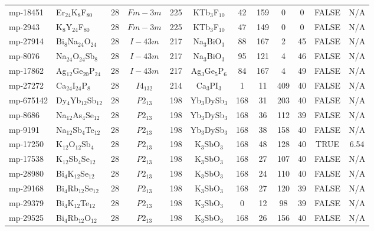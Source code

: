 {\begin{longtable}{llcccccccccc}
    mp-18451 & Er$_{24}$K$_{8}$F$_{80}$ & 28    & $Fm-3m$ & 225   & KTb$_{3}$F$_{10}$ & 42    & 159   & 0     & 0     & FALSE & N/A \\
    mp-2943 & K$_{8}$Y$_{24}$F$_{80}$ & 28    & $Fm-3m$ & 225   & KTb$_{3}$F$_{10}$ & 47    & 149   & 0     & 0     & FALSE & N/A \\
    mp-27914 & Bi$_{8}$Na$_{24}$O$_{24}$ & 28    & $I-43m$ & 217   & Na$_{3}$BiO$_{3}$ & 88    & 167   & 2     & 45    & FALSE & N/A \\
    mp-8076 & Na$_{24}$O$_{24}$Sb$_{8}$ & 28    & $I-43m$ & 217   & Na$_{3}$BiO$_{3}$ & 95    & 121   & 4     & 46    & FALSE & N/A \\
    mp-17862 & Ag$_{12}$Ge$_{20}$P$_{24}$ & 28    & $I-43m$ & 217   & Ag$_{3}$Ge$_{5}$P$_{6}$ & 84    & 167   & 4     & 49    & FALSE & N/A \\
    mp-27272 & Ca$_{24}$I$_{24}$P$_{8}$ & 28    & $I4_132$ & 214   & Ca$_{3}$PI$_{3}$ & 1     & 11    & 409   & 40    & FALSE & N/A \\
    mp-675142 & Dy$_{4}$Yb$_{12}$Sb$_{12}$ & 28    & $P2_13$ & 198   & Yb$_{3}$DySb$_{3}$ & 168   & 31    & 203   & 40    & FALSE & N/A \\
    mp-8686 & Na$_{12}$As$_{4}$Se$_{12}$ & 28    & $P2_13$ & 198   & Yb$_{3}$DySb$_{3}$ & 168   & 36    & 112   & 39    & FALSE & N/A \\
    mp-9191 & Na$_{12}$Sb$_{4}$Te$_{12}$ & 28    & $P2_13$ & 198   & Yb$_{3}$DySb$_{3}$ & 168   & 38    & 158   & 40    & FALSE & N/A \\
    mp-17250 & K$_{12}$O$_{12}$Sb$_{4}$ & 28    & $P2_13$ & 198   & K$_{3}$SbO$_{3}$ & 168   & 48    & 128   & 40    & TRUE  & 6.54  \\
    mp-17538 & K$_{12}$Sb$_{4}$Se$_{12}$ & 28    & $P2_13$ & 198   & K$_{3}$SbO$_{3}$ & 168   & 27    & 107   & 40    & FALSE & N/A \\
    mp-28980 & Bi$_{4}$K$_{12}$Se$_{12}$ & 28    & $P2_13$ & 198   & K$_{3}$SbO$_{3}$ & 168   & 24    & 110   & 40    & FALSE & N/A \\
    mp-29168 & Bi$_{4}$Rb$_{12}$Se$_{12}$ & 28    & $P2_13$ & 198   & K$_{3}$SbO$_{3}$ & 168   & 27    & 120   & 39    & FALSE & N/A \\
    mp-29379 & Bi$_{4}$K$_{12}$Te$_{12}$ & 28    & $P2_13$ & 198   & K$_{3}$SbO$_{3}$ & 0     & 12    & 98    & 39    & FALSE & N/A \\
    mp-29525 & Bi$_{4}$Rb$_{12}$O$_{12}$ & 28    & $P2_13$ & 198   & K$_{3}$SbO$_{3}$ & 168   & 26    & 156   & 40    & FALSE & N/A \\

\end{longtable}}
